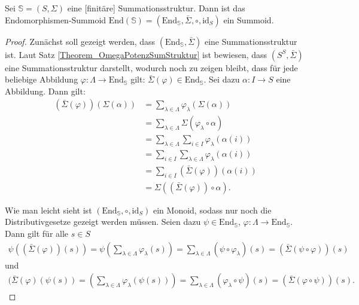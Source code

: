 \documentclass{article}
\begin{document}
\begin{theorem}\label{Theorem_SummationEndomorphismus}
  Sei $\mathbb{S} = (S, \Sigma)$ eine [finitäre] Summationsstruktur.
  Dann ist das Endomorphismen-Summoid $\text{End}(\mathbb{S}) = (\text{End}_\mathbb{S}, \bar\Sigma, \circ, \text{id}_S)$ ein Summoid.
\end{theorem}
\begin{proof}
  Zunächst soll gezeigt werden, dass $(\text{End}_\mathbb{S}, \bar\Sigma)$ eine Summationsstruktur ist.
  Laut Satz \ref{Theorem_OmegaPotenzSumStruktur} ist bewiesen, dass $(S^S, \bar\Sigma)$ eine Summationsstruktur darstellt,
  wodurch noch zu zeigen bleibt, dass für jede beliebige Abbildung $\varphi \colon \Lambda \to \text{End}_\mathbb{S}$
  gilt: $\bar\Sigma(\varphi) \in \text{End}_\mathbb{S}$. 
  Sei dazu $\alpha \colon I \to S$ eine Abbildung.
  Dann gilt:
  \begin{align*}
    (\bar\Sigma(\varphi))(\Sigma(\alpha)) 
    &= \sum_{\lambda \in \Lambda}\varphi_\lambda(\Sigma(\alpha)) \\
    &= \sum_{\lambda \in \Lambda}\Sigma(\varphi_\lambda \circ \alpha) \\ 
    &= \sum_{\lambda \in \Lambda}\sum_{i \in I}\varphi_\lambda(\alpha(i)) \\
    &= \sum_{i \in I}\sum_{\lambda \in \Lambda}\varphi_\lambda(\alpha(i)) \\
    &= \sum_{i \in I}(\bar\Sigma(\varphi))(\alpha(i)) \\
    &= \Sigma((\bar\Sigma(\varphi)) \circ \alpha).
  \end{align*}

  Wie man leicht sieht ist $(\text{End}_\mathbb{S}, \circ, \text{id}_S)$ ein Monoid, 
  sodass nur noch die Distributivgesetze gezeigt werden müssen.
  Seien dazu $\psi \in \text{End}_\mathbb{S}$, $\varphi \colon \Lambda \to \text{End}_\mathbb{S}$.
  Dann gilt für alle $s \in S$
  \begin{align*}
    \psi((\bar\Sigma(\varphi))(s))
    = \psi(\sum_{\lambda \in \Lambda}\varphi_\lambda(s))
    = \sum_{\lambda \in \Lambda}(\psi \circ \varphi_\lambda)(s)
    = (\bar\Sigma(\psi \circ \varphi))(s)
  \end{align*}
  und
  \begin{align*}
    (\bar\Sigma(\varphi)(\psi(s))
    = (\sum_{\lambda \in \Lambda}\varphi_\lambda(\psi(s)))
    = \sum_{\lambda \in \Lambda}(\varphi_\lambda \circ \psi)(s)
    = (\bar\Sigma(\varphi\circ \psi))(s).
  \end{align*}
\end{proof}
\end{document}
